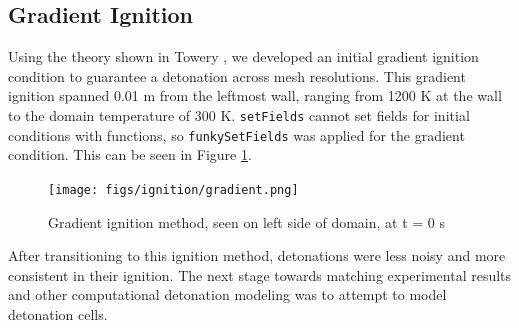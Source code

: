\subsection{Gradient Ignition}
Using the theory shown in Towery \cite{towery2}, we developed an initial gradient ignition condition to guarantee a detonation across mesh resolutions. This gradient ignition spanned 0.01 m from the leftmost wall, ranging from 1200 K at the wall to the domain temperature of 300 K. \verb|setFields| cannot set fields for initial conditions with functions, so \verb|funkySetFields| was applied for the gradient condition. This can be seen in Figure \ref{fig:gradig}. 
\begin{figure}[h]
\centering
\texttt{[image: figs/ignition/gradient.png]}
\caption{Gradient ignition method, seen on left side of domain, at t = 0 s}
\label{fig:gradig}
\end{figure}%
\noindent After transitioning to this ignition method, detonations were less noisy and more consistent in their ignition. The next stage towards matching experimental results and other computational detonation modeling was to attempt to model detonation cells. 


